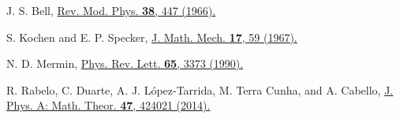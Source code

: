 \documentclass[prl,letterpaper,english,reprint,nofootinbib,aps,superscriptaddress,showpacs,showkeys]{revtex4-1}
\theoremstyle{definition}
\theoremstyle{remark}
\begin{document}
\begin{thebibliography}{10}



 J. S. Bell,
 \href{http://rmp.aps.org/abstract/RMP/v38/i3/p447_1}{Rev. Mod. Phys. \textbf{38}, 447 (1966).}


 S. Kochen and E. P. Specker,
 \href{http://www.iumj.indiana.edu/IUMJ/fulltext.php?year=1968&volume=17&artid=17004}{J. Math. Mech. \textbf{17}, 59 (1967).}


N. D. Mermin,
\href{https://journals.aps.org/prl/pdf/10.1103/PhysRevLett.65.3373}
{Phys. Rev. Lett. \textbf{65}, 3373 (1990).}

 R. Rabelo, C. Duarte, A. J. L\'opez-Tarrida, M. Terra Cunha, and A. Cabello,
 \href{https://iopscience.iop.org/article/10.1088/1751-8113/47/42/424021/meta}
 {J. Phys. A: Math. Theor. \textbf{47}, 424021 (2014).}






%
%
%




\end{thebibliography}
\end{document}
